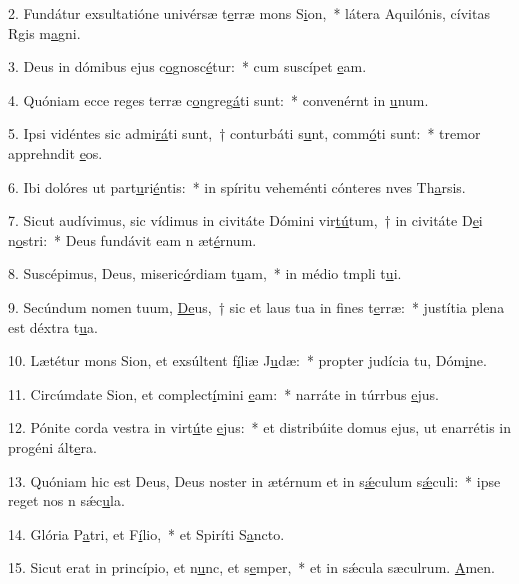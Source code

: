 2. Fundátur exsultatióne univérsæ t\uline{e}rræ mons S\uline{i}on,~* látera Aquilónis, cívitas Rgis m\uline{a}gni.\par 
3. Deus in dómibus ejus c\uline{o}gnosc\uline{é}tur:~* cum suscípet \uline{e}am.\par 
4. Quóniam ecce reges terræ c\uline{o}ngreg\uline{á}ti sunt:~* convenérnt in \uline{u}num.\par 
5. Ipsi vidéntes sic admi\uline{rá}ti sunt,~† conturbáti s\uline{u}nt, comm\uline{ó}ti sunt:~* tremor apprehndit \uline{e}os.\par 
6. Ibi dolóres ut part\uline{u}ri\uline{é}ntis:~* in spíritu veheménti cónteres nves Th\uline{a}rsis.\par 
7. Sicut audívimus, sic vídimus in civitáte Dómini vir\uline{tú}tum,~† in civitáte D\uline{e}i n\uline{o}stri:~* Deus fundávit eam n æt\uline{é}rnum.\par 
8. Suscépimus, Deus, miseric\uline{ó}rdiam t\uline{u}am,~* in médio tmpli t\uline{u}i.\par 
9. Secúndum nomen tuum, \uline{De}us,~† sic et laus tua in f\uline{i}nes t\uline{e}rræ:~* justítia plena est déxtra t\uline{u}a.\par 
10. Lætétur mons Sion, et exsúltent f\uline{í}liæ J\uline{u}dæ:~* propter judícia tu, Dóm\uline{i}ne.\par 
11. Circúmdate Sion, et complect\uline{í}mini \uline{e}am:~* narráte in túrrbus \uline{e}jus.\par 
12. Pónite corda vestra in virt\uline{ú}te \uline{e}jus:~* et distribúite domus ejus, ut enarrétis in progéni ált\uline{e}ra.\par 
13. Quóniam hic est Deus, Deus noster in ætérnum et in s\uline{ǽ}culum s\uline{ǽ}culi:~* ipse reget nos n sǽc\uline{u}la.\par 
14. Glória P\uline{a}tri, et F\uline{í}lio,~* et Spiríti S\uline{a}ncto.\par 
15. Sicut erat in princípio, et n\uline{u}nc, et s\uline{e}mper,~* et in sǽcula sæculrum. \uline{A}men.\par 
